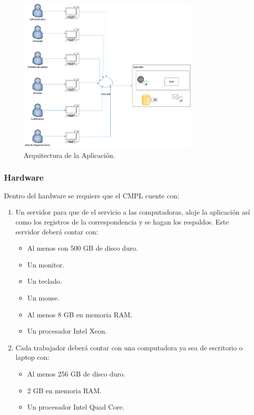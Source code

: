 \begin{figure}[htbp!]
		\centering
			\includegraphics[width=0.8\textwidth]{images/propuesta/arquitectura}
		\caption{Arquitectura de la Aplicación.}
		\label{arquitectura}
	\end{figure}
	
\subsubsection{Hardware}

Dentro del hardware se requiere que el CMPL cuente con:
\begin{enumerate}
	\item Un servidor para que de el servicio a las computadoras, aloje la aplicación así como los registros de la correspondencia y se hagan los respaldos. Este servidor deberá contar con: 
	\begin{itemize}
		\item Al menos con 500 GB de disco duro.
		\item Un monitor.
		\item Un teclado.
		\item Un mouse.
		\item Al menos 8 GB en memoria RAM.
		\item Un procesador Intel Xeon.
	\end{itemize}
	\item Cada trabajador deberá contar con una computadora ya sea de escritorio o laptop con: 
	\begin{itemize}
		\item Al menos 256 GB de disco duro.
		\item 2 GB en memoria RAM.
		\item Un procesador Intel Quad Core. 
	\end{itemize}
\end{enumerate}


